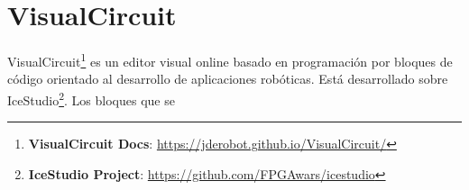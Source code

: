 \section{VisualCircuit}
\label{sec:visualcircuit}

VisualCircuit\footnote{\textbf{VisualCircuit Docs}: \url{https://jderobot.github.io/VisualCircuit/}} es un editor visual online basado en programación por bloques de código orientado al desarrollo de aplicaciones robóticas. Está desarrollado sobre IceStudio\footnote{\textbf{IceStudio Project}: \url{https://github.com/FPGAwars/icestudio}}.
Los bloques que se 




